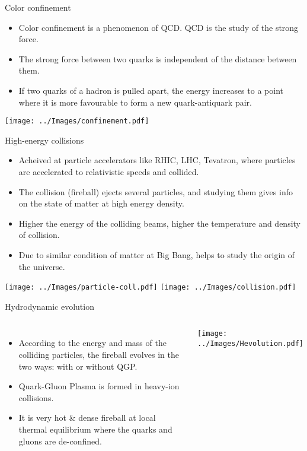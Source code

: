 \documentclass{beamer}
\begin{document}
\begin{frame}{Color confinement}
	\begin{itemize}
		\item Color confinement is a phenomenon of QCD. QCD is the study of the strong force.
		\item The strong force between two quarks is independent of the distance between them.
		\item If two quarks of a hadron is pulled apart, the energy increases to a point where it is more favourable to form a new quark-antiquark pair.
	\end{itemize}
	\texttt{[image: ../Images/confinement.pdf]}
\end{frame}
\begin{frame}{High-energy collisions}
	\begin{itemize}
		\item Acheived at particle accelerators like RHIC, LHC, Tevatron, where particles are accelerated to relativistic speeds and collided.
		\item The collision (fireball) ejects several particles, and studying them gives info on the state of matter at high energy density.
		\item Higher the energy of the colliding beams, higher the temperature and density of collision.
		\item Due to similar condition of matter at Big Bang, helps to study the origin of the universe.
	\end{itemize}
	\centering
	\texttt{[image: ../Images/particle-coll.pdf]}
	\texttt{[image: ../Images/collision.pdf]}
\end{frame}
\begin{frame}{Hydrodynamic evolution}
	\begin{columns}
		\begin{itemize}
			\item According to the energy and mass of the colliding particles, the fireball evolves in the two ways: with or without QGP.
			\item Quark-Gluon Plasma is formed in heavy-ion collisions.
			\item It is very hot \& dense fireball at local thermal equilibrium where the quarks and gluons are de-confined.
		\end{itemize}
		\texttt{[image: ../Images/Hevolution.pdf]}
	\end{columns}
\end{frame}
\end{document}
